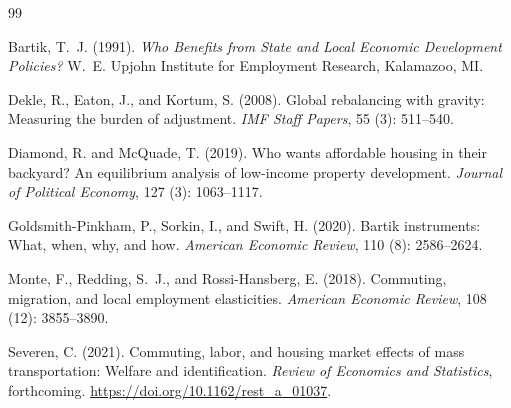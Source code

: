 \documentclass[12pt,a4paper]{article}
\begin{document}
\newpage

\begin{thebibliography}{99}

Bartik, T.~J. (1991).
\newblock \emph{Who Benefits from State and Local Economic Development
  Policies?}
\newblock W.~E. Upjohn Institute for Employment Research, Kalamazoo, MI.

Dekle, R., Eaton, J., and Kortum, S. (2008).
\newblock Global rebalancing with gravity: Measuring the burden of adjustment.
\newblock \emph{IMF Staff Papers}, 55 (3): 511--540.

Diamond, R. and McQuade, T. (2019).
\newblock Who wants affordable housing in their backyard? An equilibrium
  analysis of low-income property development.
\newblock \emph{Journal of Political Economy}, 127 (3):
  1063--1117.

Goldsmith-Pinkham, P., Sorkin, I., and Swift, H. (2020).
\newblock Bartik instruments: What, when, why, and how.
\newblock \emph{American Economic Review}, 110 (8):
  2586--2624.

Monte, F., Redding, S.~J., and Rossi-Hansberg, E. (2018).
\newblock Commuting, migration, and local employment elasticities.
\newblock \emph{American Economic Review}, 108 (12):
  3855--3890.

Severen, C. (2021).
\newblock Commuting, labor, and housing market effects of mass transportation:
  Welfare and identification.
\newblock \emph{Review of Economics and Statistics}, forthcoming.
\newblock \url{https://doi.org/10.1162/rest_a_01037}.

\end{thebibliography}
\end{document}
